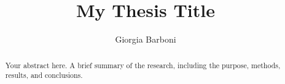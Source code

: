 \documentclass{sapthesis} %
\title{My Thesis Title}
\author{Giorgia Barboni}
\begin{document}
\maketitle


\begin{abstract}
Your abstract here.
A brief summary of the research, including the purpose, methods, results, and conclusions.
\end{abstract}


\tableofcontents







\end{document}
